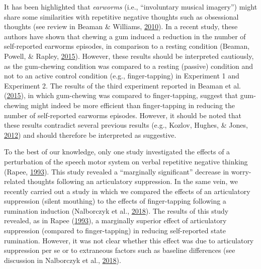 \documentclass[a4paper,12pt,twoside,openright,oldfontcommands,final]{memoir}
\begin{document}
It has been highlighted that \emph{earworms} (i.e., \enquote{involuntary musical imagery}) might share some similarities with repetitive negative thoughts such as obsessional thoughts (see review in Beaman \& Williams, \protect\hyperlink{ref-Beaman2010}{2010}). In a recent study, these authors have shown that chewing a gum induced a reduction in the number of self-reported earworms episodes, in comparison to a resting condition (Beaman, Powell, \& Rapley, \protect\hyperlink{ref-Beaman2015}{2015}). However, these results should be interpreted cautiously, as the gum-chewing condition was compared to a resting (passive) condition and not to an active control condition (e.g., finger-tapping) in Experiment 1 and Experiment 2. The results of the third experiment reported in Beaman et al. (\protect\hyperlink{ref-Beaman2015}{2015}), in which gum-chewing was compared to finger-tapping, suggest that gum-chewing might indeed be more efficient than finger-tapping in reducing the number of self-reported earworms episodes. However, it should be noted that these results contradict several previous results (e.g., Kozlov, Hughes, \& Jones, \protect\hyperlink{ref-kozlov_gummed-up_2012}{2012}) and should therefore be interpreted as suggestive.

To the best of our knowledge, only one study investigated the effects of a perturbation of the speech motor system on verbal repetitive negative thinking (Rapee, \protect\hyperlink{ref-rapee_utilisation_1993}{1993}). This study revealed a \enquote{marginally significant} decrease in worry-related thoughts following an articulatory suppression. In the same vein, we recently carried out a study in which we compared the effects of an articulatory suppression (silent mouthing) to the effects of finger-tapping following a rumination induction (Nalborczyk et al., \protect\hyperlink{ref-nalborczyk_articulatory_2018}{2018}). The results of this study revealed, as in Rapee (\protect\hyperlink{ref-rapee_utilisation_1993}{1993}), a marginally superior effect of articulatory suppression (compared to finger-tapping) in reducing self-reported state rumination. However, it was not clear whether this effect was due to articulatory suppression per se or to extraneous factors such as baseline differences (see discussion in Nalborczyk et al., \protect\hyperlink{ref-nalborczyk_articulatory_2018}{2018}).
\end{document}
